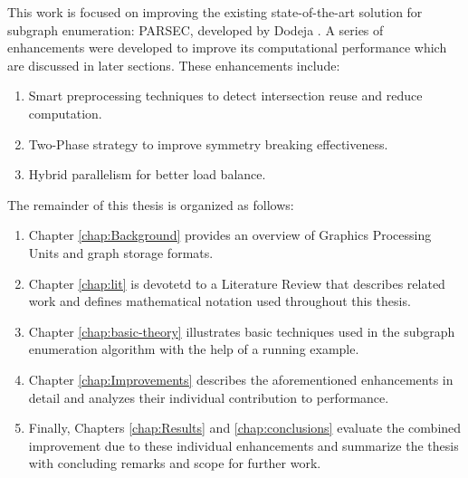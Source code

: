 This work is focused on improving the existing state-of-the-art solution for subgraph enumeration: PARSEC, developed by Dodeja \etal \cite{PARSEC_VD}.
A series of enhancements were developed to improve its computational performance which are discussed in later sections. These enhancements include:
\begin{enumerate}
    \item Smart preprocessing techniques to detect intersection reuse and reduce computation.
    \item Two-Phase strategy to improve symmetry breaking effectiveness.
    \item Hybrid parallelism for better load balance.
\end{enumerate}
The remainder of this thesis is organized as follows:
\begin{enumerate}[\indent {}]
    \item Chapter \ref{chap:Background} provides an overview of Graphics Processing Units and graph storage formats.
    \item Chapter \ref{chap:lit} is devotetd to a Literature Review that describes related work and defines mathematical notation used throughout this thesis.
    \item Chapter \ref{chap:basic-theory} illustrates basic techniques used in the subgraph enumeration algorithm with the help of a running example.
    \item Chapter \ref{chap:Improvements} describes the aforementioned enhancements in detail and analyzes their individual contribution to performance.
    \item Finally, Chapters \ref{chap:Results} and \ref{chap:conclusions} evaluate the combined improvement due to these individual enhancements and summarize the thesis with concluding remarks and scope for further work.
\end{enumerate}
